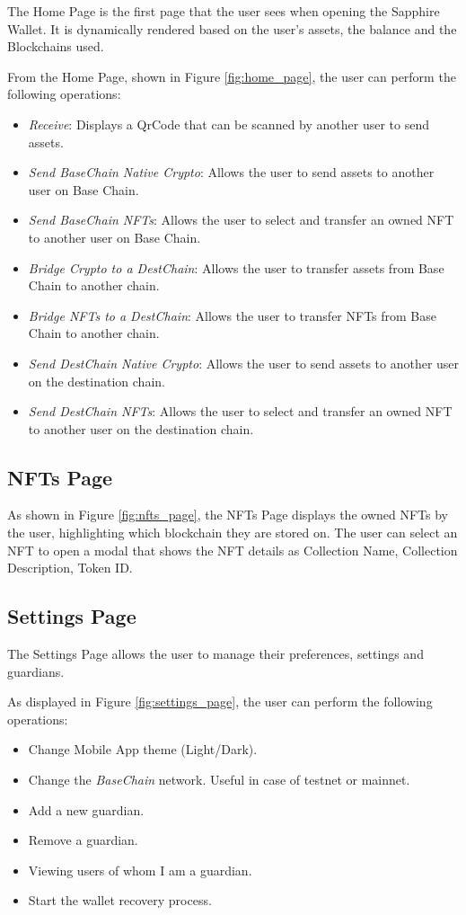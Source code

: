 
The Home Page is the first page that the user sees when opening the Sapphire Wallet. It is dynamically rendered based on the user's assets, the balance and the Blockchains used.

From the Home Page, shown in Figure \ref{fig:home_page}, the user can perform the following operations:
\begin{itemize}
    \item \textit{Receive}: Displays a QrCode that can be scanned by another user to send assets.
    \item \textit{Send BaseChain Native Crypto}: Allows the user to send assets to another user on Base Chain.
    \item \textit{Send BaseChain NFTs}: Allows the user to select and transfer an owned NFT to another user on Base Chain.
    \item \textit{Bridge Crypto to a DestChain}: Allows the user to transfer assets from Base Chain to another chain.
    \item \textit{Bridge NFTs to a DestChain}: Allows the user to transfer NFTs from Base Chain to another chain.
    \item \textit{Send DestChain Native Crypto}: Allows the user to send assets to another user on the destination chain.
    \item \textit{Send DestChain NFTs}: Allows the user to select and transfer an owned NFT to another user on the destination chain.
\end{itemize}

\subsection{NFTs Page}
\label{subsec:nfts_page}

As shown in Figure \ref{fig:nfts_page}, the NFTs Page displays the owned NFTs by the user, highlighting which blockchain they are stored on. The user can select an NFT to open a modal that shows the NFT details as Collection Name, Collection Description, Token ID. 

\subsection{Settings Page}
\label{subsec:settings_page}

The Settings Page allows the user to manage their preferences, settings and guardians. 

As displayed in Figure \ref{fig:settings_page}, the user can perform the following operations:
\begin{itemize}
    \item Change Mobile App theme (Light/Dark).
    \item Change the \textit{BaseChain} network. Useful in case of testnet or mainnet.
    \item Add a new guardian.
    \item Remove a guardian.
    \item Viewing users of whom I am a guardian.
    \item Start the wallet recovery process.
\end{itemize}

